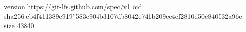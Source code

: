 version https://git-lfs.github.com/spec/v1
oid sha256:eb4f411389e9197583e904b3107db8042e741b209ee4ef2810d50c840532a96c
size 43840
